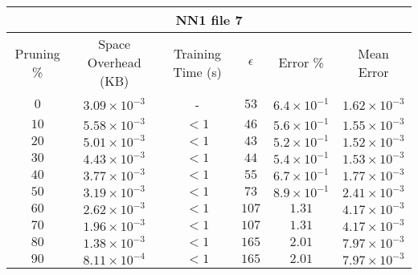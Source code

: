 \begin{adjustwidth}{0cm}{}
\begin{tabular}{cccccc}
\hline
\multicolumn{6}{c}{NN1 file 7} \\
\toprule
Pruning \% & Space Overhead (KB) & Training Time (s) & $\epsilon$ & Error \% & Mean Error\\
\midrule
$0$ & $3.09 \times 10^{-3}$ & - & $53$ & $6.4 \times 10^{-1}$ & $1.62 \times 10^{-3}$\\
$10$ & $5.58 \times 10^{-3}$ & $<1$ & $46$ & $5.6 \times 10^{-1}$ & $1.55 \times 10^{-3}$\\
$20$ & $5.01 \times 10^{-3}$ & $<1$ & $43$ & $5.2 \times 10^{-1}$ & $1.52 \times 10^{-3}$\\
$30$ & $4.43 \times 10^{-3}$ & $<1$ & $44$ & $5.4 \times 10^{-1}$ & $1.53 \times 10^{-3}$\\
$40$ & $3.77 \times 10^{-3}$ & $<1$ & $55$ & $6.7 \times 10^{-1}$ & $1.77 \times 10^{-3}$\\
$50$ & $3.19 \times 10^{-3}$ & $<1$ & $73$ & $8.9 \times 10^{-1}$ & $2.41 \times 10^{-3}$\\
$60$ & $2.62 \times 10^{-3}$ & $<1$ & $107$ & $1.31$ & $4.17 \times 10^{-3}$\\
$70$ & $1.96 \times 10^{-3}$ & $<1$ & $107$ & $1.31$ & $4.17 \times 10^{-3}$\\
$80$ & $1.38 \times 10^{-3}$ & $<1$ & $165$ & $2.01$ & $7.97 \times 10^{-3}$\\
$90$ & $8.11 \times 10^{-4}$ & $<1$ & $165$ & $2.01$ & $7.97 \times 10^{-3}$\\
\bottomrule
\end{tabular}
\end{adjustwidth}

\par\null\par
\par\null\par

